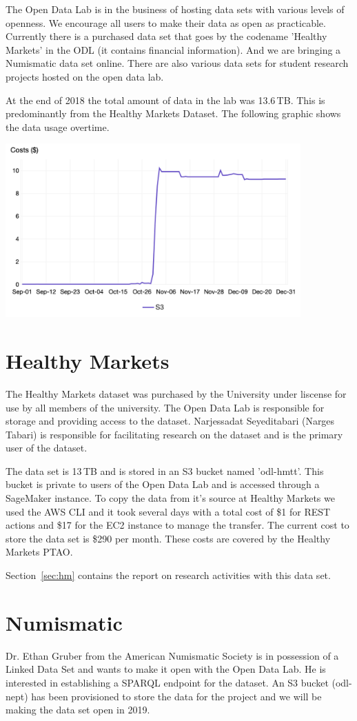 The Open Data Lab is in the business of hosting data sets with various levels of openness. We encourage all users to make their data as open as practicable. Currently there is a purchased data set that goes by the codename 'Healthy Markets' in the ODL (it contains financial information). And we are bringing a Numismatic data set online. There are also various data sets for student research  projects hosted on the open data lab.

At the end of 2018 the total amount of data in the lab was  13.6\,TB. This is predominantly from the Healthy Markets Dataset. The following graphic shows the data usage overtime.

\bigskip

\includegraphics[width=0.85\textwidth]{images/odl-s3-usage-2018.png}


\section{Healthy Markets}
The Healthy Markets dataset was purchased by the University under liscense for use by  all members of the university. The Open Data Lab is responsible for storage and providing access to the dataset. Narjessadat Seyeditabari (Narges Tabari) is responsible for facilitating research on the dataset and is the primary user of the dataset.

The data set is 13\,TB and is stored in an S3 bucket named 'odl-hmtt'. This bucket is private to users of the Open Data Lab and is accessed through a SageMaker instance. To copy the data from it's source at Healthy Markets we used the AWS CLI and it took several days with a total cost of \$1 for REST actions and \$17 for the EC2 instance to manage the transfer. The current cost to store the data set is \$290 per month. These costs are covered by the Healthy Markets PTAO.

Section~\ref{sec:hm} contains the report on research activities with this data set.

\section{Numismatic}
Dr. Ethan Gruber from the American Numismatic Society is in possession of a Linked Data Set  and wants to make it open with the Open Data Lab. He is interested in establishing a SPARQL endpoint for the  dataset. An S3 bucket (odl-nept) has been provisioned to store the data for the project and we will be making the data set open in  2019.